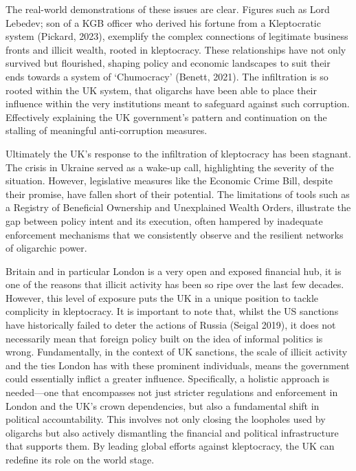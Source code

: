 \documentclass{article}
\begin{document}
The real-world demonstrations of these issues are clear. Figures such as Lord Lebedev; son of a KGB officer who derived his fortune from a Kleptocratic system (Pickard, 2023), exemplify the complex connections of legitimate business fronts and illicit wealth, rooted in kleptocracy. These relationships have not only survived but flourished, shaping policy and economic landscapes to suit their ends towards a system of ‘Chumocracy’ (Benett, 2021). The infiltration is so rooted within the UK system, that oligarchs have been able to place their influence within the very institutions meant to safeguard against such corruption. Effectively explaining the UK government's pattern and continuation on the stalling of meaningful anti-corruption measures.

Ultimately the UK's response to the infiltration of kleptocracy has been stagnant. The crisis in Ukraine served as a wake-up call, highlighting the severity of the situation. However, legislative measures like the Economic Crime Bill, despite their promise, have fallen short of their potential. The limitations of tools such as a Registry of Beneficial Ownership and Unexplained Wealth Orders, illustrate the gap between policy intent and its execution, often hampered by inadequate enforcement mechanisms that we consistently observe and the resilient networks of oligarchic power.

Britain and in particular London is a very open and exposed financial hub, it is one of the reasons that illicit activity has been so ripe over the last few decades. However, this level of exposure puts the UK in a unique position to tackle complicity in kleptocracy. It is important to note that, whilst the US sanctions have historically failed to deter the actions of Russia (Seigal 2019), it does not necessarily mean that foreign policy built on the idea of informal politics is wrong. Fundamentally, in the context of UK sanctions, the scale of illicit activity and the ties London has with these prominent individuals, means the government could essentially inflict a greater influence. Specifically, a holistic approach is needed—one that encompasses not just stricter regulations and enforcement in London and the UK’s crown dependencies, but also a fundamental shift in political accountability. This involves not only closing the loopholes used by oligarchs but also actively dismantling the financial and political infrastructure that supports them. By leading global efforts against kleptocracy, the UK can redefine its role on the world stage.
\end{document}
